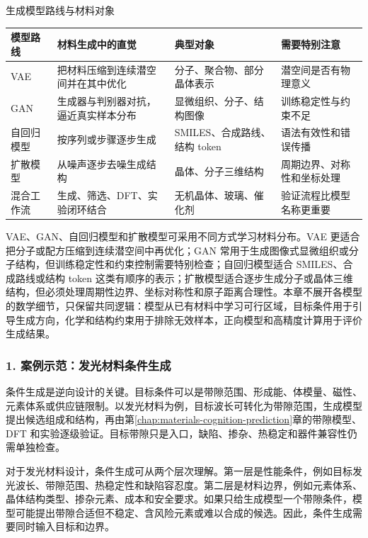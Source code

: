 \begin{formalTable}[htbp]
\caption{生成模型路线与材料对象}
\label{tab:generative-model-routes}
\begin{tabularx}{\textwidth}{@{}YYYY@{}}
\toprule
\textbf{模型路线} & \textbf{材料生成中的直觉} & \textbf{典型对象} & \textbf{需要特别注意} \\
\midrule
VAE & 把材料压缩到连续潜空间并在其中优化 & 分子、聚合物、部分晶体表示 & 潜空间是否有物理意义 \\
GAN & 生成器与判别器对抗，逼近真实样本分布 & 显微组织、分子、结构图像 & 训练稳定性与约束不足 \\
自回归模型 & 按序列或步骤逐步生成 & SMILES、合成路线、结构 token & 语法有效性和错误传播 \\
扩散模型 & 从噪声逐步去噪生成结构 & 晶体、分子三维结构 & 周期边界、对称性和坐标处理 \\
混合工作流 & 生成、筛选、DFT、实验闭环结合 & 无机晶体、玻璃、催化剂 & 验证流程比模型名称更重要 \\
\bottomrule
\end{tabularx}
\end{formalTable}

VAE、GAN、自回归模型和扩散模型可采用不同方式学习材料分布。VAE 更适合把分子或配方压缩到连续潜空间中再优化；GAN 常用于生成图像式显微组织或分子结构，但训练稳定性和约束控制需要特别检查；自回归模型适合 SMILES、合成路线或结构 token 这类有顺序的表示；扩散模型适合逐步生成分子或晶体三维结构，但必须处理周期性边界、坐标对称性和原子距离合理性。本章不展开各模型的数学细节，只保留共同逻辑：模型从已有材料中学习可行区域，目标条件用于引导生成方向，化学和结构约束用于排除无效样本，正向模型和高精度计算用于评价生成结果。


\subsubsection*{\textbf{1. 案例示范：发光材料条件生成}}

条件生成是逆向设计的关键。目标条件可以是带隙范围、形成能、体模量、磁性、元素体系或供应链限制。以发光材料为例，目标波长可转化为带隙范围，生成模型提出候选组成和结构，再由第\ref{chap:materials-cognition-prediction}章的带隙模型、DFT 和实验逐级验证。目标带隙只是入口，缺陷、掺杂、热稳定和器件兼容性仍需单独检查。

对于发光材料设计，条件生成可从两个层次理解。第一层是性能条件，例如目标发光波长、带隙范围、热稳定性和缺陷容忍度。第二层是材料边界，例如元素体系、晶体结构类型、掺杂元素、成本和安全要求。如果只给生成模型一个带隙条件，模型可能提出带隙合适但不稳定、含风险元素或难以合成的候选。因此，条件生成需要同时输入目标和边界。

